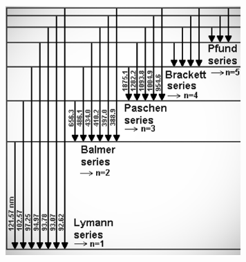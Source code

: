 \documentclass[a4paper,11pt]{article}
\begin{document}
\begin{figure}[h]
    \centering
    \includegraphics[width=9cm]{28-10.25(serie_idrogeno).png}
    \label{fig:serie_idrogeno}
\end{figure}
\end{document}
